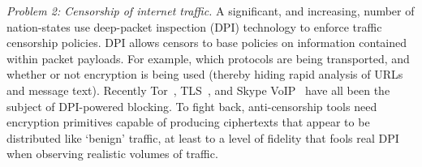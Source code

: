 \begin{newitemize}
\item{\em Problem 2: Censorship of internet traffic.}
A significant, and increasing, number of nation-states use deep-packet
inspection (DPI) technology to enforce traffic censorship policies.
DPI allows censors to base policies on information contained within packet
payloads.  For example, which protocols are being transported, and
whether or not encryption is being used (thereby hiding rapid analysis
of URLs and message text).  Recently
Tor~\cite{Tor:iran_block-2011,Tor:iran_block,Tor:china_block_one,Tor:china_block,
Tor:china_active_probe,Winter2012,Clayton06ignoringthe},
TLS~\cite{TLS:iran_block}, and Skype
VoIP~\cite{China_skype_ban,UAE_skype_ban} have all been the subject of
DPI-powered blocking.
To fight back, anti-censorship tools need encryption primitives
capable of producing ciphertexts that appear to be distributed like
`benign' traffic, at least to a level of fidelity that fools real DPI
when observing realistic volumes of traffic.



\end{newitemize}

